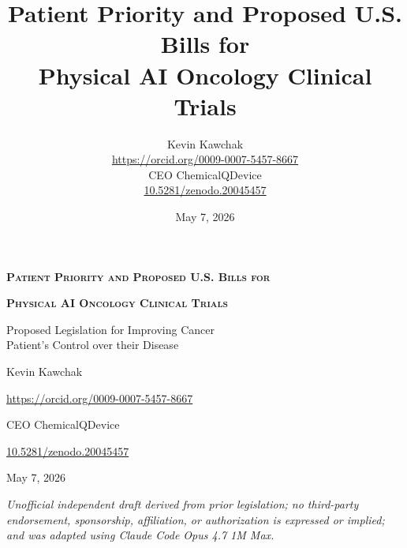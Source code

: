 \documentclass[11pt,letterpaper]{article}
\title{Patient Priority and Proposed U.S. Bills for\\
Physical AI Oncology Clinical Trials}
\author{%
  Kevin Kawchak\\
  \href{https://orcid.org/0009-0007-5457-8667}{https://orcid.org/0009-0007-5457-8667}\\
  CEO ChemicalQDevice\\
  \href{https://doi.org/10.5281/zenodo.20045457}{10.5281/zenodo.20045457}
}
\date{May 7, 2026}
\newcommand{\subtitlestr}{Proposed Legislation for Improving Cancer\\Patient's Control over their Disease}
\begin{document}
\thispagestyle{empty}

\begin{center}
\vspace*{0.4in}

{\LARGE\bfseries\scshape Patient Priority and Proposed U.S. Bills for\par}
{\LARGE\bfseries\scshape Physical AI Oncology Clinical Trials\par}

\vspace{0.35in}

{\large \subtitlestr\par}

\vspace{0.40in}

{\normalsize Kevin Kawchak\par}

\vspace{0.10in}

{\normalsize \href{https://orcid.org/0009-0007-5457-8667}{https://orcid.org/0009-0007-5457-8667}\par}

\vspace{0.10in}

{\normalsize CEO ChemicalQDevice\par}

\vspace{0.10in}

{\normalsize \href{https://doi.org/10.5281/zenodo.20045457}{10.5281/zenodo.20045457}\par}

\vspace{0.10in}

{\normalsize May 7, 2026\par}

\vspace{0.30in}
\end{center}

\begin{center}
\footnotesize
\textit{Unofficial independent draft derived from prior legislation; no
third-party endorsement, sponsorship, affiliation, or authorization is
expressed or implied; and was adapted using Claude Code Opus 4.7 1M
Max.}
\end{center}
\end{document}
